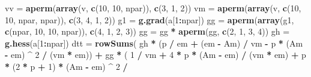\documentclass[]{article}
\newenvironment{Shaded}{\begin{snugshade}}{\end{snugshade}}
\newcommand{\DecValTok}[1]{\textcolor[rgb]{0.00,0.00,0.81}{#1}}
\newcommand{\KeywordTok}[1]{\textcolor[rgb]{0.13,0.29,0.53}{\textbf{#1}}}
\newcommand{\NormalTok}[1]{#1}
\newcommand{\OperatorTok}[1]{\textcolor[rgb]{0.81,0.36,0.00}{\textbf{#1}}}
\newcommand{\StringTok}[1]{\textcolor[rgb]{0.31,0.60,0.02}{#1}}
\begin{document}
\begin{Shaded}
\begin{Highlighting}[]
\NormalTok{  vv =}\StringTok{ }\KeywordTok{aperm}\NormalTok{(}\KeywordTok{array}\NormalTok{(v, }\KeywordTok{c}\NormalTok{(}\DecValTok{10}\NormalTok{, }\DecValTok{10}\NormalTok{, npar)), }\KeywordTok{c}\NormalTok{(}\DecValTok{3}\NormalTok{, }\DecValTok{1}\NormalTok{, }\DecValTok{2}\NormalTok{))}
\NormalTok{  vm =}\StringTok{ }\KeywordTok{aperm}\NormalTok{(}\KeywordTok{array}\NormalTok{(v, }\KeywordTok{c}\NormalTok{(}\DecValTok{10}\NormalTok{, }\DecValTok{10}\NormalTok{, npar, npar)), }\KeywordTok{c}\NormalTok{(}\DecValTok{3}\NormalTok{, }\DecValTok{4}\NormalTok{, }\DecValTok{1}\NormalTok{, }\DecValTok{2}\NormalTok{))}
\NormalTok{  g1 =}\StringTok{ }\KeywordTok{g.grad}\NormalTok{(a[}\DecValTok{1}\OperatorTok{:}\NormalTok{npar])}
\NormalTok{  gg =}\StringTok{ }\KeywordTok{aperm}\NormalTok{(}\KeywordTok{array}\NormalTok{(g1, }\KeywordTok{c}\NormalTok{(npar, }\DecValTok{10}\NormalTok{, }\DecValTok{10}\NormalTok{, npar)), }\KeywordTok{c}\NormalTok{(}\DecValTok{4}\NormalTok{, }\DecValTok{1}\NormalTok{, }\DecValTok{2}\NormalTok{, }\DecValTok{3}\NormalTok{))}
\NormalTok{  gg =}\StringTok{ }\NormalTok{gg }\OperatorTok{*}\StringTok{ }\KeywordTok{aperm}\NormalTok{(gg, }\KeywordTok{c}\NormalTok{(}\DecValTok{2}\NormalTok{, }\DecValTok{1}\NormalTok{, }\DecValTok{3}\NormalTok{, }\DecValTok{4}\NormalTok{))}
\NormalTok{  gh =}\StringTok{ }\KeywordTok{g.hess}\NormalTok{(a[}\DecValTok{1}\OperatorTok{:}\NormalTok{npar])}
\NormalTok{  dtt =}\StringTok{ }\KeywordTok{rowSums}\NormalTok{(}
\NormalTok{    gh }\OperatorTok{*}\StringTok{ }\NormalTok{(p }\OperatorTok{/}\StringTok{ }\NormalTok{em }\OperatorTok{+}\StringTok{ }\NormalTok{(em }\OperatorTok{-}\StringTok{ }\NormalTok{Am) }\OperatorTok{/}\StringTok{ }\NormalTok{vm }\OperatorTok{-}\StringTok{ }\NormalTok{p }\OperatorTok{*}\StringTok{ }\NormalTok{(Am }\OperatorTok{-}\StringTok{ }\NormalTok{em) }\OperatorTok{^}\StringTok{ }\DecValTok{2} \OperatorTok{/}\StringTok{ }\NormalTok{(vm }\OperatorTok{*}\StringTok{ }\NormalTok{em)) }\OperatorTok{+}
\StringTok{      }\NormalTok{gg }\OperatorTok{*}\StringTok{ }\NormalTok{(}
        \DecValTok{1} \OperatorTok{/}\StringTok{ }\NormalTok{vm }\OperatorTok{+}\StringTok{ }\DecValTok{4} \OperatorTok{*}\StringTok{ }\NormalTok{p }\OperatorTok{*}\StringTok{ }\NormalTok{(Am }\OperatorTok{-}\StringTok{ }\NormalTok{em) }\OperatorTok{/}\StringTok{ }\NormalTok{(vm }\OperatorTok{*}\StringTok{ }\NormalTok{em) }\OperatorTok{+}\StringTok{ }\NormalTok{p }\OperatorTok{*}\StringTok{ }\NormalTok{(}\DecValTok{2} \OperatorTok{*}\StringTok{ }\NormalTok{p }\OperatorTok{+}\StringTok{ }\DecValTok{1}\NormalTok{) }\OperatorTok{*}\StringTok{ }\NormalTok{(Am }\OperatorTok{-}\StringTok{ }\NormalTok{em) }\OperatorTok{^}\StringTok{ }\DecValTok{2} \OperatorTok{/}

\end{Highlighting}
\end{Shaded}
\end{document}
